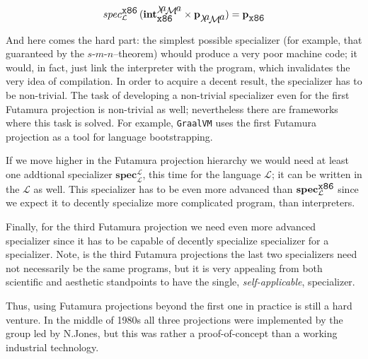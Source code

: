 \documentclass{book}
\newcommand{\primi}[1]{\mathbf{#1}}
\newcommand{\Int}[2]{\primi{int}^{\mathcal {#1}}_{\mathcal {#2}}}
\newcommand{\Spec}[2]{\primi{spec}^{\mathcal{#1}}_{\mathcal {#2}}}
\newcommand{\SpecS}[2]{{spec}^{\mathcal{#1}}_{\mathcal {#2}}}
\newcommand{\ph}{{\phantom{x}}}
\newcommand{\lama}{$\lambda\kern -.1667em\lower -.5ex\hbox{$a$}\kern -.1000em\lower .2ex\hbox{$\mathcal M$}\kern -.1000em\lower -.5ex\hbox{$a$}$\xspace}
\begin{document}
\[
\SpecS{\mbox{\texttt{x86}}}{\mathcal{L}}\,(\Int{\mbox{\lama}}{\mbox{\texttt{x86}}}\times \primi{p}^\ph_{\mbox{\lama}})=\primi{p}^\ph_{\mbox{\texttt{x86}}}
\]


And here comes the hard part: the simplest possible specializer (for example, that guaranteed by the $s$-$m$-$n$--theorem) whould produce a very
poor machine code; it would, in fact, just link the interpreter with the program, which invalidates the very idea of compilation. In order to
acquire a decent result, the specializer has to be non-trivial. The task of developing a non-trivial specializer even for the first Futamura
projection is non-trivial as well; nevertheless there are frameworks where this task is solved. For example, \texttt{GraalVM} uses the first Futamura projection
as a tool for language bootstrapping.

If we move higher in the Futamura projection hierarchy we would need at least one addtional specializer $\Spec{L}{L}$, this time
for the language $\mathcal{L}$; it can be written in the $\mathcal{L}$ as well. This specializer has to be even more advanced than
$\Spec{\mbox{\texttt{x86}}}{\mathcal{L}}$ since we expect it to decently specialize more complicated program, than interpreters.

Finally, for the third Futamura projection we need even more advanced specializer since it has to be capable of decently specialize specializer for a
specializer. Note, is the third Futamura projections the last two specializers need not necessarily be the same programs, but it is very
appealing from both scientific and aesthetic standpoints to have the single, \emph{self-applicable}, specializer.

Thus, using Futamura projections beyond the first one in practice is still a hard venture. In the middle of 1980s all three projections were
implemented by the group led by N.Jones, but this was rather a proof-of-concept than a working industrial technology.
\end{document}
